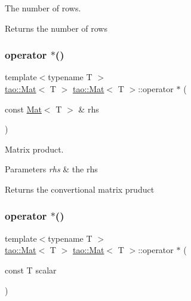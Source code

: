 The number of rows. 

\begin{DoxyReturn}{Returns}
the number of rows 
\end{DoxyReturn}
\mbox{\label{classtao_1_1_mat_ad328f559aab180d67e0fb4558c6c92a0}} 
\subsubsection{\texorpdfstring{operator $\ast$()}{operator *()}\hspace{0.1cm}{\footnotesize\ttfamily [1/2]}}
{\footnotesize\ttfamily template$<$typename T $>$ \\
\mbox{\hyperlink{classtao_1_1_mat}{tao\+::\+Mat}}$<$ T $>$ \mbox{\hyperlink{classtao_1_1_mat}{tao\+::\+Mat}}$<$ T $>$\+::operator $\ast$ (\begin{DoxyParamCaption}\item[{const \mbox{\hyperlink{classtao_1_1_mat}{Mat}}$<$ T $>$ \&}]{rhs }\end{DoxyParamCaption})}



Matrix product. 


\begin{DoxyParams}{Parameters}
{\em rhs} & the rhs \\
\hline
\end{DoxyParams}
\begin{DoxyReturn}{Returns}
the convertional matrix pruduct 
\end{DoxyReturn}
\mbox{\label{classtao_1_1_mat_a83de238ae44b6cf2bcaa342dd514f333}} 
\subsubsection{\texorpdfstring{operator $\ast$()}{operator *()}\hspace{0.1cm}{\footnotesize\ttfamily [2/2]}}
{\footnotesize\ttfamily template$<$typename T $>$ \\
\mbox{\hyperlink{classtao_1_1_mat}{tao\+::\+Mat}}$<$ T $>$ \mbox{\hyperlink{classtao_1_1_mat}{tao\+::\+Mat}}$<$ T $>$\+::operator $\ast$ (\begin{DoxyParamCaption}\item[{const T}]{scalar }\end{DoxyParamCaption})}



